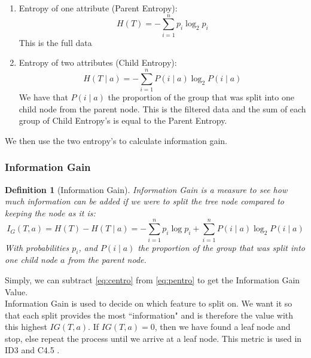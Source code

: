 \documentclass[11pt,a4paper]{report}
\newtheorem{definition}{Definition}
\begin{document}
\begin{enumerate}
    \item Entropy of one attribute (Parent Entropy):
    \begin{equation}
        H(T) = -\sum_{i=1}^{n} p_i \log_2 p_i
        \label{eq:pentro}
    \end{equation}
    This is the full data
    
    \item Entropy of two attributes (Child Entropy):
    \begin{equation}
       H(T \mid a) = -\sum_{i=1}^{n} P(i \mid a) \log_2 P(i \mid a) 
       \label{eq:centro}
    \end{equation}
    We have that $P(i \mid a)$ the proportion of the group that was split into one child node from the parent node.
    This is the filtered data and the sum of each group of Child Entropy's is equal to the Parent Entropy.
\end{enumerate}
We then use the two entropy's to calculate information gain.

\subsubsection{Information Gain}
\begin{definition}[Information Gain]
Information Gain is a measure to see how much information can be added if we were to split the tree node compared to keeping the node as it is:
\begin{equation}
    I_G(T,a) = H(T) - H(T \mid a) = -\sum_{i=1}^{n} p_i \log p_i
    + \sum_{i=1}^{n} P(i \mid a) \log_2 P(i \mid a) 
    \label{eq:ig}
\end{equation}
With probabilities $p_i$, and $P(i \mid a)$ the proportion of the group that was split into one child node $a$ from the parent node.
\end{definition}
Simply, we can subtract \ref{eq:centro} from \ref{eq:pentro} to get the Information Gain Value.
\medskip\\
Information Gain is used to decide on which feature to split on. We want it so that each split provides the most ``information" and is therefore the value with this highest $IG(T,a)$. If $IG(T,a) = 0$, then we have found a leaf node and stop, else repeat the process until we arrive at a leaf node. This metric is used in ID3 and C4.5 \cite{Quinlan}.
\end{document}
